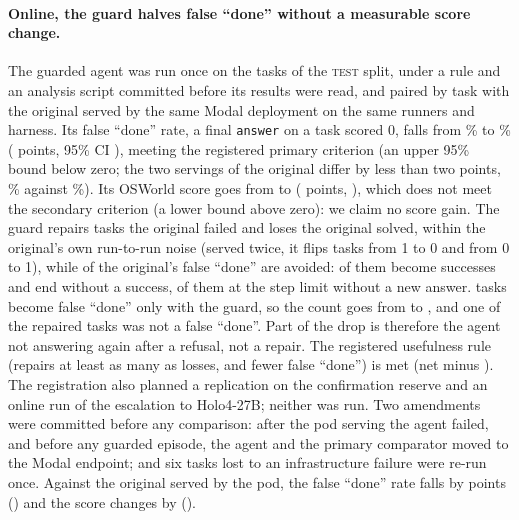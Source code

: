 \paragraph{Online, the guard halves false ``done'' without a measurable score change.} The guarded agent was run once on the \OgN{} tasks of the \textsc{test} split, under a rule and an analysis script committed before its results were read, and paired by task with the original served by the same Modal deployment on the same runners and harness. Its false ``done'' rate, a final \texttt{answer} on a task scored 0, falls from \OgFdBase\% to \OgFdGuard\% (\OgFdDiff{} points, 95\% CI \OgFdDiffCi), meeting the registered primary criterion (an upper 95\% bound below zero; the two servings of the original differ by less than two points, \OgpodFdBase\% against \OgFdBase\%). Its OSWorld score goes from \OgScoreBase{} to \OgScoreGuard{} (\OgScoreDiff{} points, \OgScoreDiffCi), which does not meet the secondary criterion (a lower bound above zero): we claim no score gain. The guard repairs \OgB{} tasks the original failed and loses \OgC{} the original solved, within the original's own run-to-run noise (served twice, it flips \ogNoiseDown{} tasks from 1 to 0 and \ogNoiseUp{} from 0 to 1), while \OgE{} of the original's false ``done'' are avoided: \ogAvoidSucc{} of them become successes and \ogAvoidOther{} end without a success, \ogAvoidCap{} of them at the step limit without a new answer. \ogNewFd{} tasks become false ``done'' only with the guard, so the count goes from \ogFdBaseN{} to \ogFdGuardN, and one of the \OgB{} repaired tasks was not a false ``done''. Part of the drop is therefore the agent not answering again after a refusal, not a repair. The registered usefulness rule (repairs at least as many as losses, and fewer false ``done'') is met (net \OgB{} minus \OgC). The registration also planned a replication on the confirmation reserve and an online run of the escalation to Holo4-27B; neither was run. Two amendments were committed before any comparison: after the pod serving the agent failed, and before any guarded episode, the agent and the primary comparator moved to the Modal endpoint; and six tasks lost to an infrastructure failure were re-run once. Against the original served by the pod, the false ``done'' rate falls by \OgpodFdDiff{} points (\OgpodFdDiffCi) and the score changes by \OgpodScoreDiff{} (\OgpodScoreDiffCi). %

